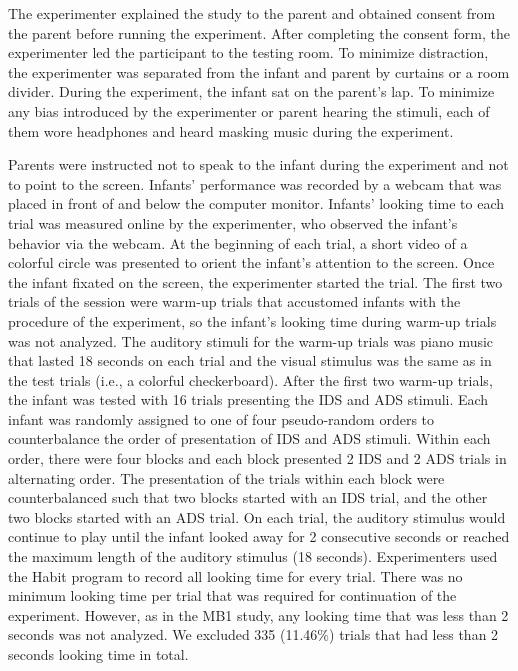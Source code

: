 \documentclass[
  english,
  ,man,floatsintext]{apa6}
\begin{document}
The experimenter explained the study to the parent and obtained consent from the parent before running the experiment. After completing the consent form, the experimenter led the participant to the testing room. To minimize distraction, the experimenter was separated from the infant and parent by curtains or a room divider. During the experiment, the infant sat on the parent's lap. To minimize any bias introduced by the experimenter or parent hearing the stimuli, each of them wore headphones and heard masking music during the experiment.

Parents were instructed not to speak to the infant during the experiment and not to point to the screen. Infants' performance was recorded by a webcam that was placed in front of and below the computer monitor. Infants' looking time to each trial was measured online by the experimenter, who observed the infant's behavior via the webcam. At the beginning of each trial, a short video of a colorful circle was presented to orient the infant's attention to the screen. Once the infant fixated on the screen, the experimenter started the trial. The first two trials of the session were warm-up trials that accustomed infants with the procedure of the experiment, so the infant's looking time during warm-up trials was not analyzed. The auditory stimuli for the warm-up trials was piano music that lasted 18 seconds on each trial and the visual stimulus was the same as in the test trials (i.e., a colorful checkerboard). After the first two warm-up trials, the infant was tested with 16 trials presenting the IDS and ADS stimuli. Each infant was randomly assigned to one of four pseudo-random orders to counterbalance the order of presentation of IDS and ADS stimuli. Within each order, there were four blocks and each block presented 2 IDS and 2 ADS trials in alternating order. The presentation of the trials within each block were counterbalanced such that two blocks started with an IDS trial, and the other two blocks started with an ADS trial. On each trial, the auditory stimulus would continue to play until the infant looked away for 2 consecutive seconds or reached the maximum length of the auditory stimulus (18 seconds). Experimenters used the Habit program to record all looking time for every trial. There was no minimum looking time per trial that was required for continuation of the experiment. However, as in the MB1 study, any looking time that was less than 2 seconds was not analyzed. We excluded 335 (11.46\%) trials that had less than 2 seconds looking time in total.
\end{document}
